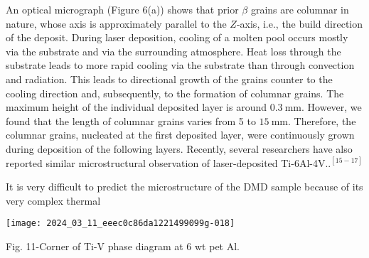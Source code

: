 \documentclass[10pt]{article}
\begin{document}
An optical micrograph (Figure 6(a)) shows that prior $\beta$ grains are columnar in nature, whose axis is approximately parallel to the $Z$-axis, i.e., the build direction of the deposit. During laser deposition, cooling of a molten pool occurs mostly via the substrate and via the surrounding atmosphere. Heat loss through the substrate leads to more rapid cooling via the substrate than through convection and radiation. This leads to directional growth of the grains counter to the cooling direction and, subsequently, to the formation of columnar grains. The maximum height of the individual deposited layer is around $0.3 \mathrm{~mm}$. However, we found that the length of columnar grains varies from 5 to $15 \mathrm{~mm}$. Therefore, the columnar grains, nucleated at the first deposited layer, were continuously grown during deposition of the following layers. Recently, several researchers have also reported similar microstructural observation of laser-deposited Ti-6Al-4V..$^{[15-17]}$

It is very difficult to predict the microstructure of the DMD sample because of its very complex thermal

\begin{center}
\texttt{[image: 2024\_03\_11\_eeec0c86da1221499099g-018]}
\end{center}

Fig. 11-Corner of Ti-V phase diagram at 6 wt pet Al.
\end{document}
